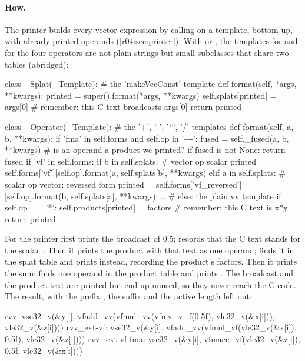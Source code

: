 \paragraph{How.} The printer builds every vector expression by calling  on
a template, bottom up, with already printed operands (\cref{r04:sec:printer}). With
 or , the templates for  and for the four
operators are not plain strings but small  subclasses that share two tables
(abridged):
\begin{pycode}
class _Splat(_Template):          # the 'makeVecConst' template
    def format(self, *args, **kwargs):
        printed = super().format(*args, **kwargs)
        self.splats[printed] = args[0]          # remember: this C text broadcasts args[0]
        return printed

class _Operator(_Template):       # the '+', '-', '*', '/' templates
    def format(self, a, b, **kwargs):
        if 'fma' in self.forms and self.op in '+-':
            fused = self._fused(a, b, **kwargs)     # is an operand a product we printed?
            if fused is not None:
                return fused
        if 'vf' in self.forms:
            if b in self.splats:                    # vector op scalar
                printed = self.forms['vf'][self.op].format(a, self.splats[b], **kwargs)
            elif a in self.splats:                  # scalar op vector: reversed form
                printed = self.forms['vf_reversed'][self.op].format(b, self.splats[a], **kwargs)
        ...                                         # else: the plain vv template
        if self.op == '*':
            self.products[printed] = factors        # remember: this C text is x*y
        return printed
\end{pycode}
For  the printer first prints the broadcast of 0.5;
 records that the C text  stands
for the scalar . Then it prints the product with that text as one operand;
 finds it in the splat table and prints 
instead, recording the product's factors. Then it prints the sum; 
finds one operand in the product table and prints . The
broadcast and the product text are printed but end up unused, so they never reach the
C code. The result, with the prefix , the suffix  and the
active length left out:
\begin{plaincode}
rvv:             vse32_v(&y[i], vfadd_vv(vfmul_vv(vfmv_v_f(0.5f), vle32_v(&x[i])), vle32_v(&z[i])))
rvv_ext-vf:      vse32_v(&y[i], vfadd_vv(vfmul_vf(vle32_v(&x[i]), 0.5f), vle32_v(&z[i])))
rvv_ext-vf-fma:  vse32_v(&y[i], vfmacc_vf(vle32_v(&z[i]), 0.5f, vle32_v(&x[i])))
\end{plaincode}

